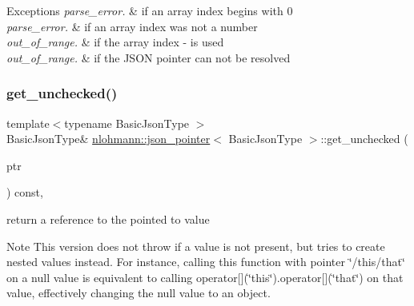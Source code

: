 \begin{DoxyExceptions}{Exceptions}
{\em parse\+\_\+error.} & if an array index begins with \textquotesingle{}0\textquotesingle{} \\
\hline
{\em parse\+\_\+error.} & if an array index was not a number \\
\hline
{\em out\+\_\+of\+\_\+range.} & if the array index \textquotesingle{}-\/\textquotesingle{} is used \\
\hline
{\em out\+\_\+of\+\_\+range.} & if the J\+S\+ON pointer can not be resolved \\
\hline
\end{DoxyExceptions}
\mbox{\label{classnlohmann_1_1json__pointer_a577512ee6b7f030e8872b4d29fa5c3e5}} 
\subsubsection{\texorpdfstring{get\+\_\+unchecked()}{get\_unchecked()}\hspace{0.1cm}{\footnotesize\ttfamily [1/2]}}
{\footnotesize\ttfamily template$<$typename Basic\+Json\+Type $>$ \\
Basic\+Json\+Type\& \hyperlink{classnlohmann_1_1json__pointer}{nlohmann\+::json\+\_\+pointer}$<$ Basic\+Json\+Type $>$\+::get\+\_\+unchecked (\begin{DoxyParamCaption}\item[{Basic\+Json\+Type $\ast$}]{ptr }\end{DoxyParamCaption}) const\hspace{0.3cm}{\ttfamily [inline]}, {\ttfamily [private]}}



return a reference to the pointed to value 

\begin{DoxyNote}{Note}
This version does not throw if a value is not present, but tries to create nested values instead. For instance, calling this function with pointer {\ttfamily \char`\"{}/this/that\char`\"{}} on a null value is equivalent to calling {\ttfamily operator\mbox{[}\mbox{]}(\char`\"{}this\char`\"{}).operator\mbox{[}\mbox{]}(\char`\"{}that\char`\"{})} on that value, effectively changing the null value to an object.
\end{DoxyNote}

